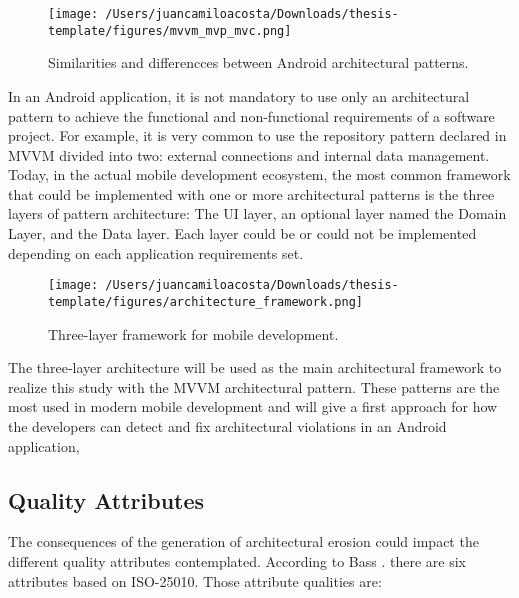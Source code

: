 \begin{figure}
    \centering
    \texttt{[image: /Users/juancamiloacosta/Downloads/thesis-template/figures/mvvm\_mvp\_mvc.png]}
    \caption{Similarities and differencces between Android architectural patterns. \citet{} }
    \label{fig:concept-map}
\end{figure}


In an Android application, it is not mandatory to use only an architectural pattern to achieve the functional and non-functional requirements of a software project. For example, it is very common to use the repository pattern declared in MVVM divided into two: external connections and internal data management. Today, in the actual mobile development ecosystem, the most common framework that could be implemented with one or more architectural patterns is the three layers of pattern architecture: The UI layer, an optional layer named the Domain Layer, and the Data layer. Each layer could be or could not be implemented depending on each application requirements set. 

\begin{figure}
    \centering
    \texttt{[image: /Users/juancamiloacosta/Downloads/thesis-template/figures/architecture\_framework.png]}
    \caption{Three-layer framework for mobile development. \citet{} }
    \label{fig:concept-map}
\end{figure}

The three-layer architecture will be used as the main architectural framework to realize this study with the MVVM architectural pattern. These patterns are the most used in modern mobile development and will give a first approach for how the developers can detect and fix architectural violations in an Android application,

\subsection{Quality Attributes}
The consequences of the generation of architectural erosion could impact the different quality attributes contemplated. According to Bass \citet{bass-architecture-book}. there are six attributes based on ISO-25010. Those attribute qualities are:

